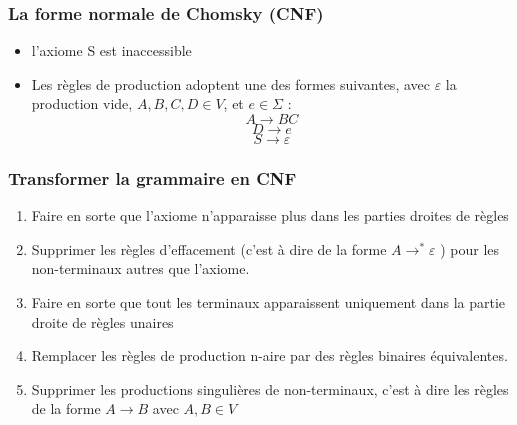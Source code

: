 \documentclass{beamer}
\begin{document}
\begin{frame} 
\frametitle{La forme normale de Chomsky (CNF)}
 \begin{itemize}
 \item {l'axiome S est inaccessible}
 \item {Les règles de production adoptent une des formes suivantes, avec  $\varepsilon$ la production vide, $A,B,C,D \in V$, et $e \in \Sigma$ : 
     $$A \rightarrow B C $$ 
     $$ D \rightarrow e $$
     $$ S \rightarrow \varepsilon$$ }

 \end{itemize}

\end{frame}

\begin{frame}
 \frametitle{Transformer la grammaire en CNF}
 \begin{enumerate}
 \item<1>{ Faire en sorte que l'axiome n'apparaisse plus dans les parties droites de règles}
 \item<1>{Supprimer les règles d'effacement (c'est à dire de la forme $A \rightarrow^*\varepsilon$ ) pour les non-terminaux autres que l'axiome.}
 \item<1>{Faire en sorte que tout les terminaux apparaissent uniquement dans la partie droite de règles unaires }
 \item<1-2>{Remplacer les règles de production n-aire par des règles binaires équivalentes.}
 \item<1-2>{Supprimer les productions singulières de non-terminaux, c'est à dire les règles de la forme $A \rightarrow B$ avec $A,B \in V$ }
 \end{enumerate}
 

 
\end{frame}



\end{document}
